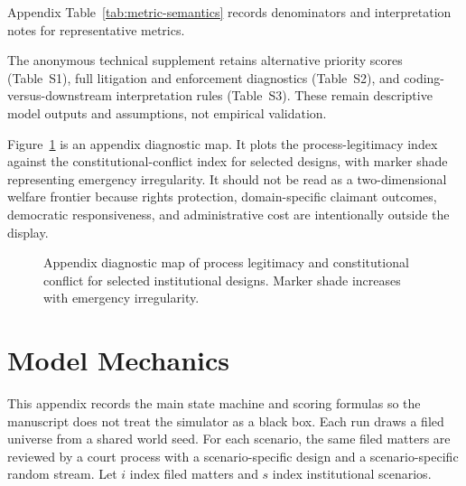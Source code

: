 \documentclass[
    journal=jlc,
    manuscript=research-article,
    year=2026,
  ]{cup-journal}
\providecommand{\Description}[1]{}
\begin{document}


Appendix Table~\ref{tab:metric-semantics} records denominators and interpretation notes for representative metrics.



The anonymous technical supplement retains alternative priority scores (Table~S1), full litigation and enforcement diagnostics (Table~S2), and coding-versus-downstream interpretation rules (Table~S3). These remain descriptive model outputs and assumptions, not empirical validation.

Figure~\ref{fig:conflict-confidence} is an appendix diagnostic map. It plots the process-legitimacy index against the constitutional-conflict index for selected designs, with marker shade representing emergency irregularity. It should not be read as a two-dimensional welfare frontier because rights protection, domain-specific claimant outcomes, democratic responsiveness, and administrative cost are intentionally outside the display.

\begin{figure}[hbt!]
\centering

\caption{Appendix diagnostic map of process legitimacy and constitutional conflict for selected institutional designs. Marker shade increases with emergency irregularity.}
\Description{Scatter plot of process legitimacy against constitutional-conflict index for selected court designs. Higher vertical placement and lower horizontal placement are better, and marker shade increases as emergency irregularity rises.}
\label{fig:conflict-confidence}
\end{figure}

\clearpage
\section{Model Mechanics}
\label{app:mechanics}

This appendix records the main state machine and scoring formulas so the manuscript does not treat the simulator as a black box. Each run draws a filed universe from a shared world seed. For each scenario, the same filed matters are reviewed by a court process with a scenario-specific design and a scenario-specific random stream. Let $i$ index filed matters and $s$ index institutional scenarios.
\end{document}
